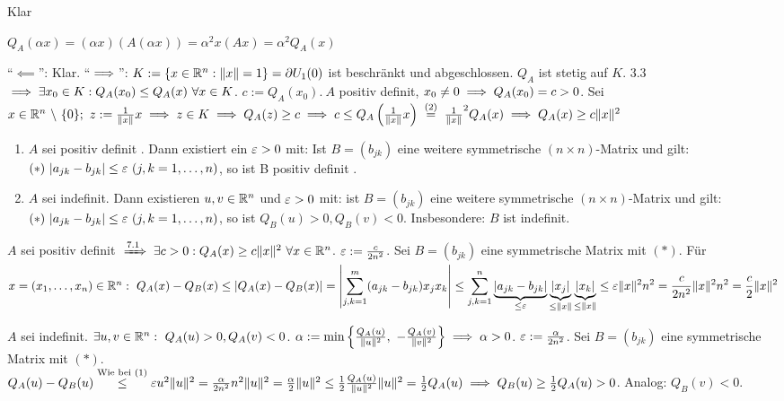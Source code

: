 \documentclass[a4paper,oneside,DIV15,BCOR12mm,chapterprefix=true,headings=onelinechapter]{scrbook}
\begin{document}
\begin{beweise}
\item Klar
\item $Q_A(\alpha x)=(\alpha x)(A(\alpha x))=\alpha^2x(Ax)=\alpha^2Q_A(x)$
\item "`$\impliedby$"': Klar. "`$\implies$"': $K:=\{x\in\mathbb{R}^n: \|x\|=1\}=\partial U_1(0)$ ist beschränkt und abgeschlossen. $Q_A$ ist stetig auf $K$. 3.3 $\implies\exists x_0\in K: Q_A(x_0)\le Q_A(x)\ \forall x\in K$. $c:=Q_A(x_0).\ A$ positiv definit, $x_0\ne 0\implies Q_A(x_0)=c>0$. Sei $x\in\MdR^n\ \backslash\ \{0\};\ z:=\frac{1}{\|x\|}x\folgt z\in K\folgt Q_A(z)\ge c\folgt c \le Q_A\left(\frac{1}{\|x\|}x\right)\gleichnach{(2)}\frac{1}{\|x\|}^2Q_A(x)\folgt Q_A(x)\ge c\|x\|^2$
\end{beweise}

\begin{satz}
\begin{enumerate}
\item $A$ sei positiv definit . Dann existiert ein $\varepsilon>0$ mit: Ist $B=(b_{jk})$ eine weitere symmetrische $(n\times n)$-Matrix und gilt: $(*)\ |a_{jk}-b_{jk}|\le\ep\ (j,k=1,\ldots, n)$, so ist B positiv definit .
\item $A$ sei indefinit. Dann existieren $u,v\in\mathbb{R}^n$ und $\varepsilon>0$ mit: ist $B=(b_{jk})$ eine weitere symmetrische $(n\times n)$-Matrix und gilt: $(*)\ |a_{jk}-b_{jk}|\le\ep\ (j,k=1,\ldots,n)$, so ist $Q_B(u)>0, Q_B(v)<0$. Insbesondere: $B$ ist indefinit.
\end{enumerate}
\end{satz}

\begin{beweise}
\item $A$ sei positiv definit $\folgtnach{7.1}\exists c>0: Q_A(x)\ge c\|x\|^2\ \forall x\in\MdR^n$. $\varepsilon:=\frac{c}{2n^2}$. Sei $B=(b_{jk})$ eine symmetrische Matrix mit $(*)$. Für $x=(x_1,\ldots,x_n)\in\MdR^n:\ Q_A(x)-Q_B(x)\le|Q_A(x)-Q_B(x)|=\left|\ds\sum_{j,k=1}^m(a_{jk}-b_{jk})x_jx_k\right|\le\ds\sum_{j,k=1}^n\underbrace{|a_{jk}-b_{jk}|}_{\le\ep}\underbrace{|x_j|}_{\le\|x\|}\underbrace{|x_k|}_{\le\|x\|}\le\ep\|x\|^2n^2=\frac{c}{2n^2}\|x\|^2n^2=\frac{c}{2}\|x\|^2$
\item $A$ sei indefinit. $\exists u,v\in\MdR^n:\ Q_A(u)>0, Q_A(v)<0$. $\alpha:=\min\left\{\frac{Q_A(u)}{\|u\|^2},\ -\frac{Q_A(v)}{\|v\|^2}\right\}\folgt\alpha>0$. $\varepsilon:=\frac{\alpha}{2n^2}$. Sei $B=(b_{jk})$ eine symmetrische Matrix mit $(*)$.\\
$Q_A(u)-Q_B(u)\overset{\text{Wie bei (1)}}{\le}\varepsilon u^2\|u\|^2=\frac{\alpha}{2n^2}n^2\|u\|^2=\frac{\alpha}{2}\|u\|^2\le\frac{1}{2}\frac{Q_A(u)}{\|u\|^2}\|u\|^2=\frac{1}{2}Q_A(u) \implies Q_B(u)\ge\frac{1}{2}Q_A(u)>0$. Analog: $Q_B(v)<0$.
\end{beweise}
\end{document}
